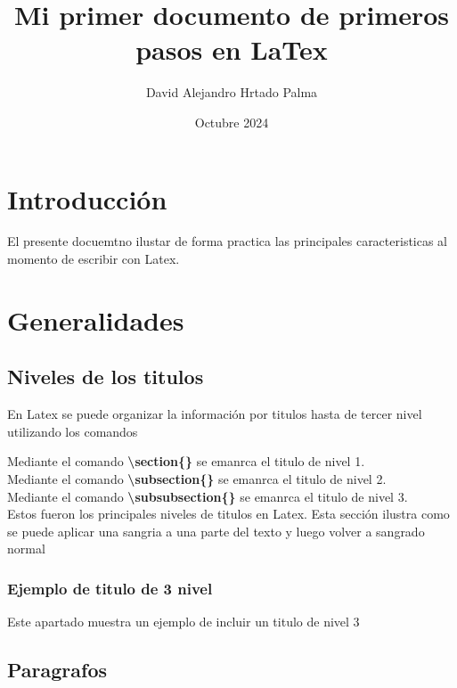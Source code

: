 \documentclass{article}
\title{Mi primer documento de primeros pasos en LaTex}
\author{David Alejandro Hrtado Palma}
\date{Octubre 2024}
\begin{document}
\maketitle

\newpage
\tableofcontents
\listoffigures
\listoftables
\newpage

\section{Introducción}
El presente docuemtno ilustar de forma practica las principales caracteristicas al momento de escribir con Latex.

\section{Generalidades}

\subsection{Niveles de los titulos}

En Latex se puede organizar la información por titulos hasta de tercer nivel utilizando los comandos\\

\setlength{\parindent}{2em} %

Mediante el comando \textbf{\textbackslash section\{\}} se emanrca el titulo de nivel 1. \\

Mediante el comando \textbf{\textbackslash subsection\{\}} se emanrca el titulo de nivel 2. \\

Mediante el comando \textbf{\textbackslash subsubsection\{\}} se emanrca el titulo de nivel 3.\\

\noindent Estos fueron los principales niveles de titulos en Latex. Esta sección ilustra como se puede aplicar una
sangria a una parte del texto y luego volver a sangrado normal


\subsubsection{Ejemplo de titulo de 3 nivel}

Este apartado muestra un ejemplo de incluir un titulo de nivel 3

\subsection{Paragrafos}
\end{document}
